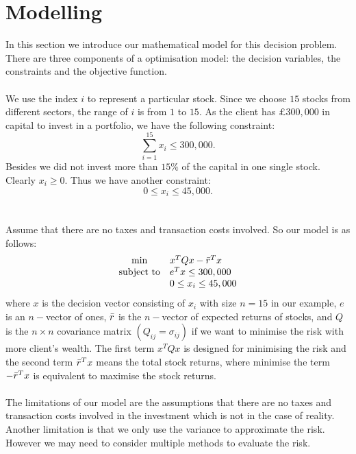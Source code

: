 
\section{Modelling}

In this section we introduce our mathematical model for this decision problem. There are three components of a optimisation model: the decision variables, the constraints and the objective function.
\\ \hspace*{\fill} \\
We use the index $i$ to represent a particular stock. Since we choose $15$ stocks from different sectors, the range of $i$ is from $1$ to $15$. As the client has $\pounds 300,000$ in capital to invest in a portfolio, we have the following constraint:
\begin{equation*}
    \sum_{i=1}^{15}x_i \leq 300,000.
\end{equation*}
Besides we did not invest more than $15\%$ of the capital in one single stock. Clearly $x_i \geq 0$. Thus we have another constraint:
\begin{equation*}
    0 \leq x_i \leq 45,000.
\end{equation*}
\\ \hspace*{\fill} \\
Assume that there are no taxes and transaction costs involved. So our model is as follows:
$$
\begin{array}{cl}
\min & x^{T} Q x - \Bar{r}^{T} x \\
\text {subject to} & e^{T} x \leq 300,000 \\
& 0 \leq x_i \leq 45,000 
\end{array}
$$
where $x$ is the decision vector consisting of $x_i$ with size $n = 15$ in our example, $e$ is an $n-$vector of ones, $\Bar{r}$ is the $n-$vector of expected returns of stocks, and $Q$ is the $n \times n$ covariance matrix $(Q_{ij} = \sigma_{ij})$ if we want to minimise the risk with more client's wealth. The first term $x^{T} Q x$ is designed for minimising the risk and the second term $\Bar{r}^{T} x$ means the total stock returns, where minimise the term $-\Bar{r}^{T} x$ is equivalent to maximise the stock returns.
\\ \hspace*{\fill} \\
The limitations of our model are the assumptions that there are no taxes and transaction costs involved in the investment which is not in the case of reality. Another limitation is that we only use the variance to approximate the risk. However we may need to consider multiple methods to evaluate the risk. 

\newpage